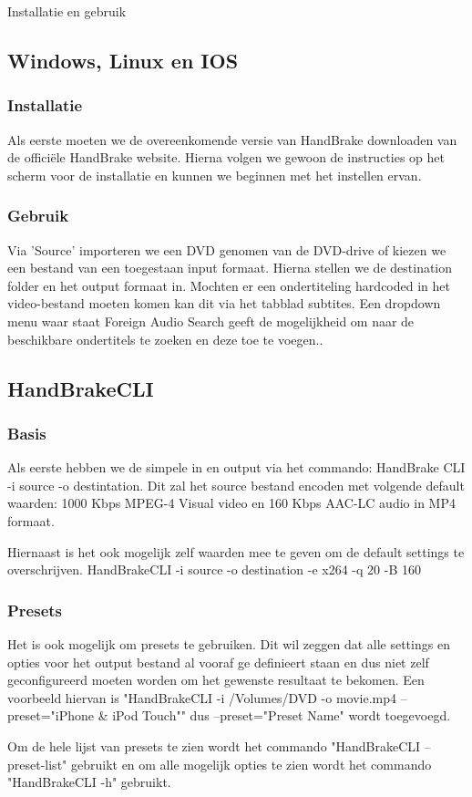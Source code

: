 \label{Hoofdstuk 3}

\begin{sectionbox}{Installatie en gebruik}\end{sectionbox}

\subsection{Windows, Linux en IOS}

\subsubsection{Installatie}
Als eerste moeten we de overeenkomende versie van HandBrake downloaden van de officiële HandBrake website\cite{Download}. Hierna volgen we gewoon de instructies op het scherm voor de installatie en kunnen we beginnen met het instellen ervan.


\subsubsection{Gebruik}
Via 'Source' importeren we een DVD genomen van de DVD-drive of kiezen we een bestand van een toegestaan input formaat. Hierna stellen we de destination folder en het output formaat in. Mochten er een ondertiteling hardcoded in het video-bestand moeten komen kan dit via het tabblad subtites. Een dropdown menu waar staat Foreign Audio Search geeft de mogelijkheid om naar de beschikbare ondertitels te zoeken en deze toe te voegen..

\subsection{HandBrakeCLI}
\subsubsection{Basis}

Als eerste hebben we de simpele in en output via het commando: HandBrake CLI -i source -o destintation. Dit zal het source bestand encoden met volgende default waarden: 1000 Kbps MPEG-4 Visual video en 160 Kbps AAC-LC audio in MP4 formaat.

Hiernaast is het ook mogelijk zelf waarden mee te geven om de default settings te overschrijven. HandBrakeCLI -i source -o destination -e x264 -q 20 -B 160

\subsubsection{Presets}

Het is ook mogelijk om presets te gebruiken. Dit wil zeggen dat alle settings en opties voor het output bestand al vooraf ge definieert staan en dus niet zelf geconfigureerd moeten worden om het gewenste resultaat te bekomen. Een voorbeeld hiervan is "HandBrakeCLI -i /Volumes/DVD -o movie.mp4 --preset="iPhone \& iPod Touch"" dus --preset="Preset Name" wordt toegevoegd.

Om de hele lijst van presets te zien wordt het commando "HandBrakeCLI --preset-list" gebruikt en om alle mogelijk opties te zien wordt het commando "HandBrakeCLI -h" gebruikt.
\newpage